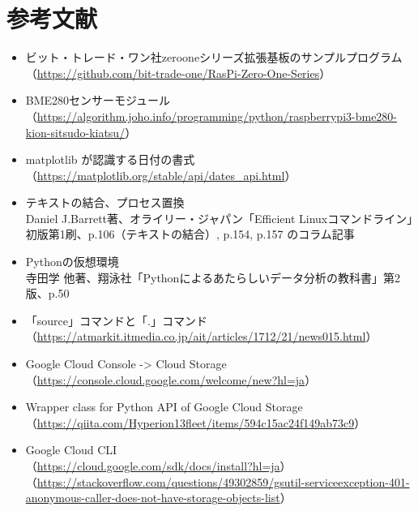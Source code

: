 \documentclass[12pt,a4paper,uplatex]{jsarticle}
\begin{document}
\section{参考文献}

\begin{itemize}
	\item ビット・トレード・ワン社zerooneシリーズ拡張基板のサンプルプログラム\\
	（\url{https://github.com/bit-trade-one/RasPi-Zero-One-Series}）
	\item BME280センサーモジュール\\
	（\url{https://algorithm.joho.info/programming/python/raspberrypi3-bme280-kion-sitsudo-kiatsu/}）
	\item matplotlib が認識する日付の書式\\
	（\url{https://matplotlib.org/stable/api/dates_api.html}）
	\item テキストの結合、プロセス置換\\
	Daniel J.Barrett著、オライリー・ジャパン「Efficient Linuxコマンドライン」初版第1刷、p.106（テキストの結合）, p.154, p.157 のコラム記事
	\item Pythonの仮想環境\\
	寺田学 他著、翔泳社「Pythonによるあたらしいデータ分析の教科書」第2版、p.50
	\item 「source」コマンドと「.」コマンド\\
	（\url{https://atmarkit.itmedia.co.jp/ait/articles/1712/21/news015.html}）
	\item Google Cloud Console -> Cloud Storage\\
	（\url{https://console.cloud.google.com/welcome/new?hl=ja}）
	\item Wrapper class for Python API of Google Cloud Storage\\
	（\url{https://qiita.com/Hyperion13fleet/items/594c15ac24f149ab73c9}）
	\item Google Cloud CLI\\
	（\url{https://cloud.google.com/sdk/docs/install?hl=ja}）\\
	（\url{https://stackoverflow.com/questions/49302859/gsutil-serviceexception-401-anonymous-caller-does-not-have-storage-objects-list}）
\end{itemize}
\end{document}

